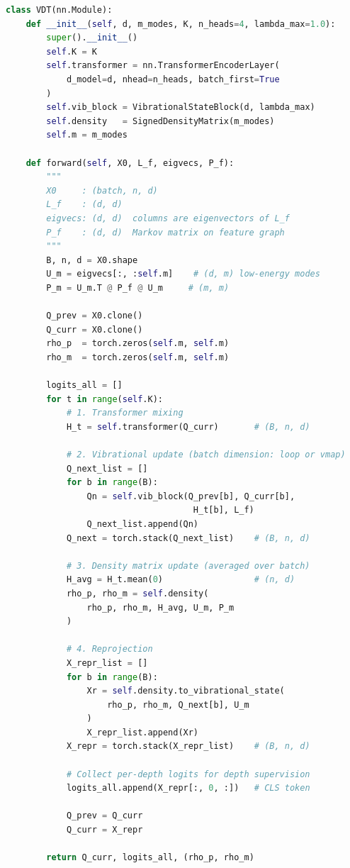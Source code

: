 \documentclass[12pt,a4paper]{article}
\theoremstyle{plain}
\theoremstyle{definition}
\theoremstyle{remark}
\newcommand{\1}{\mathbf{1}}
\begin{document}
\begin{lstlisting}[language=Python,
  caption={Sketch of the full VDT recurrent forward pass.}]
class VDT(nn.Module):
    def __init__(self, d, m_modes, K, n_heads=4, lambda_max=1.0):
        super().__init__()
        self.K = K
        self.transformer = nn.TransformerEncoderLayer(
            d_model=d, nhead=n_heads, batch_first=True
        )
        self.vib_block = VibrationalStateBlock(d, lambda_max)
        self.density   = SignedDensityMatrix(m_modes)
        self.m = m_modes

    def forward(self, X0, L_f, eigvecs, P_f):
        """
        X0     : (batch, n, d)
        L_f    : (d, d)
        eigvecs: (d, d)  columns are eigenvectors of L_f
        P_f    : (d, d)  Markov matrix on feature graph
        """
        B, n, d = X0.shape
        U_m = eigvecs[:, :self.m]    # (d, m) low-energy modes
        P_m = U_m.T @ P_f @ U_m     # (m, m)

        Q_prev = X0.clone()
        Q_curr = X0.clone()
        rho_p  = torch.zeros(self.m, self.m)
        rho_m  = torch.zeros(self.m, self.m)

        logits_all = []
        for t in range(self.K):
            # 1. Transformer mixing
            H_t = self.transformer(Q_curr)       # (B, n, d)

            # 2. Vibrational update (batch dimension: loop or vmap)
            Q_next_list = []
            for b in range(B):
                Qn = self.vib_block(Q_prev[b], Q_curr[b],
                                     H_t[b], L_f)
                Q_next_list.append(Qn)
            Q_next = torch.stack(Q_next_list)    # (B, n, d)

            # 3. Density matrix update (averaged over batch)
            H_avg = H_t.mean(0)                  # (n, d)
            rho_p, rho_m = self.density(
                rho_p, rho_m, H_avg, U_m, P_m
            )

            # 4. Reprojection
            X_repr_list = []
            for b in range(B):
                Xr = self.density.to_vibrational_state(
                    rho_p, rho_m, Q_next[b], U_m
                )
                X_repr_list.append(Xr)
            X_repr = torch.stack(X_repr_list)    # (B, n, d)

            # Collect per-depth logits for depth supervision
            logits_all.append(X_repr[:, 0, :])   # CLS token

            Q_prev = Q_curr
            Q_curr = X_repr

        return Q_curr, logits_all, (rho_p, rho_m)
\end{lstlisting}
\end{document}
